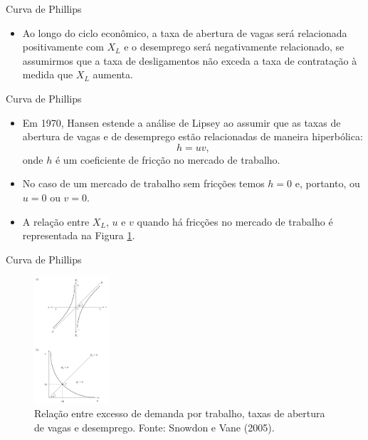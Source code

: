 \documentclass[10pt]{beamer}
\begin{document}
\begin{frame}{Curva de Phillips}
    \begin{itemize}
        \item Ao longo do ciclo econômico, a taxa de abertura de vagas será relacionada positivamente com $X_L$ e o desemprego será negativamente relacionado, se assumirmos que a taxa de desligamentos não exceda a taxa de contratação à medida que $X_L$ aumenta.
    \end{itemize}
\end{frame}

\begin{frame}{Curva de Phillips}
    \begin{itemize}
        \item Em 1970, Hansen estende a análise de Lipsey ao assumir que as taxas de abertura de vagas e de desemprego estão relacionadas de maneira hiperbólica:
        \[
        h = uv,
        \]
        onde $h$ é um coeficiente de fricção no mercado de trabalho.
        \bigskip
        \item No caso de um mercado de trabalho sem fricções temos $h = 0$ e, portanto, ou $u = 0$ ou $v = 0$.
        \bigskip
        \item A relação entre $X_L$, $u$ e $v$ quando há fricções no mercado de trabalho é representada na Figura \ref{fig13}.
    \end{itemize}
\end{frame}

\begin{frame}{Curva de Phillips}
    \begin{figure}
        \centering
        \includegraphics[width=0.25\textwidth]{./figures/aula8_fig5.PNG}
        \caption{Relação entre excesso de demanda por trabalho, taxas de abertura de vagas e desemprego. Fonte: Snowdon e Vane (2005).}
        \label{fig13}
    \end{figure}
\end{frame}
\end{document}
